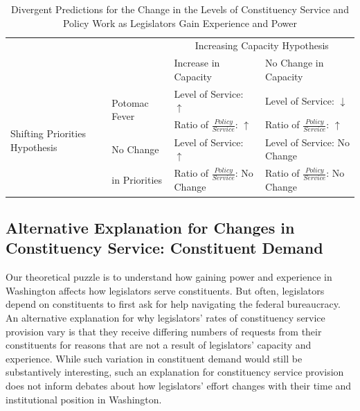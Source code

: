 \documentclass[12pt]{article}
\begin{document}
\begin{table}[]
\caption{Divergent Predictions for the Change in the Levels of Constituency Service and Policy Work as Legislators Gain Experience and Power}\label{t:theory}

\begin{tabular}{p{.15\linewidth}|p{.20\linewidth}|p{.32\linewidth}|p{.33\linewidth}|}
\hline
\multicolumn{2}{l}{\multirow{2}{*}{}} & \multicolumn{2}{|c|}{Increasing Capacity Hypothesis} \\ \cline{3-4}
\multicolumn{2}{l|}{}    &  Increase in Capacity  &   No Change in Capacity \\ \cline{1-4} 
\multirow{4}{1.8cm}{Shifting Priorities Hypothesis}  &   \multirow{2}{2cm}{Potomac Fever}   &  Level of Service: $\uparrow$  &  Level of Service: $\downarrow$  \\ 
& &  Ratio of $\frac{Policy}{Service}$: $\uparrow$   &   Ratio of $\frac{Policy}{Service}$: $\uparrow$  \\ \cline{2-4}
 &  No Change    &  Level of Service: $\uparrow$  & Level of Service: No Change \\ 
 & in Priorities &   Ratio of $\frac{Policy}{Service}$: No Change  & Ratio of $\frac{Policy}{Service}$: No Change\\ \hline
\end{tabular}
\end{table}








\subsection{Alternative Explanation for Changes in Constituency Service: Constituent Demand}

Our theoretical puzzle is to understand how gaining power and experience in Washington affects how legislators serve constituents. But often, legislators depend on constituents to first ask for help navigating the federal bureaucracy. An alternative explanation for why legislators' rates of constituency service provision vary is that they receive differing numbers of requests from their constituents for reasons that are not a result of legislators' capacity and experience. While such variation in constituent demand would still be substantively interesting, such an explanation for constituency service provision does not inform debates about how legislators' effort changes with their time and institutional position in Washington. 
\end{document}
